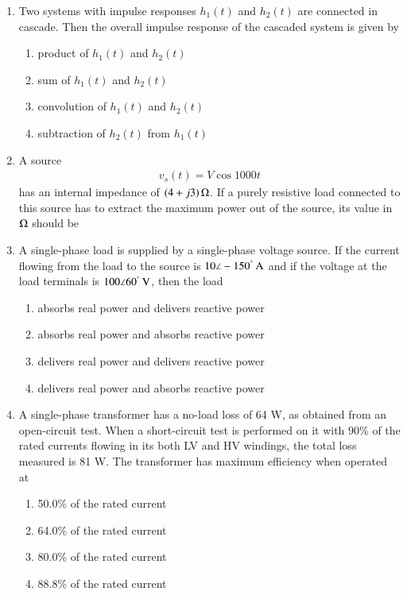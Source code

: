 \documentclass[journal,12pt,onecolumn]{IEEEtran}
\theoremstyle{remark}
\begin{document}
\begin{enumerate}
  \item Two systems with impulse responses $h_1(t)$ and $h_2(t)$ are connected in cascade. Then the overall impulse response of the cascaded system is given by  
  \begin{enumerate}
    \item product of $h_1(t)$ and $h_2(t)$  
    \item sum of $h_1(t)$ and $h_2(t)$  
    \item convolution of $h_1(t)$ and $h_2(t)$  
    \item subtraction of $h_2(t)$ from $h_1(t)$  
  \end{enumerate}

  \item A source 
  \begin{align*}
      v_s(t) = V \cos 1000 t
  \end{align*}
  has an internal impedance of $(4 + j3)\,\ohm$. If a purely resistive load connected to this source has to extract the maximum power out of the source, its value in $\ohm$ should be  
  \begin{enumerate}
     \end{enumerate}

  \item A single-phase load is supplied by a single-phase voltage source. If the current flowing from the load to the source is $10\angle -150^\degree \,\text{A}$ and if the voltage at the load terminals is $100\angle 60^\degree\,\text{V}$, then the load  
  \begin{enumerate}
    \item absorbs real power and delivers reactive power  
    \item absorbs real power and absorbs reactive power  
    \item delivers real power and delivers reactive power  
    \item delivers real power and absorbs reactive power  
  \end{enumerate}

  \item A single-phase transformer has a no-load loss of 64 W, as obtained from an open-circuit test. When a short-circuit test is performed on it with 90\% of the rated currents flowing in its both LV and HV windings, the total loss measured is 81 W. The transformer has maximum efficiency when operated at  
  \begin{enumerate}
    \item 50.0\% of the rated current  
    \item 64.0\% of the rated current  
    \item 80.0\% of the rated current  
    \item 88.8\% of the rated current  
  \end{enumerate}


\end{enumerate}
\end{document}

